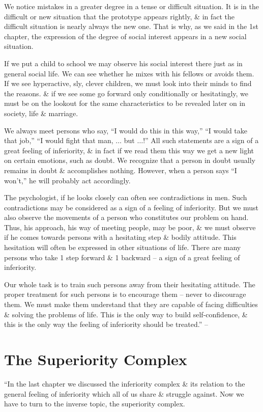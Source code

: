 \documentclass{article}
\numberwithin{equation}{section}
\begin{document}
We notice mistakes in a greater degree in a tense or difficult situation. It is in the difficult or new situation that the prototype appears rightly, \& in fact the difficult situation is nearly always the new one. That is why, as we said in the 1st chapter, the expression of the degree of social interest appears in a new social situation.

If we put a child to school we may observe his social interest there just as in general social life. We can see whether he mixes with his fellows or avoids them. If we see hyperactive, sly, clever children, we must look into their minds to find the reasons. \& if we see some go forward only conditionally or hesitatingly, we must be on the lookout for the same characteristics to be revealed later on in society, life \& marriage.

We always meet persons who say, ``I would do this in this way,'' ``I would take that job,'' ``I would fight that man, $\ldots$ but $\ldots$!'' All such statements are a sign of a great feeling of inferiority, \& in fact if we read them this way we get a new light on certain emotions, such as doubt. We recognize that a person in doubt usually remains in doubt \& accomplishes nothing. However, when a person says ``I won't,'' he will probably act accordingly.

The psychologist, if he looks closely can often see contradictions in men. Such contradictions may be considered as a sign of a feeling of inferiority. But we must also observe the movements of a person who constitutes our problem on hand. Thus, his approach, his way of meeting people, may be poor, \& we must observe if he comes towards persons with a hesitating step \& bodily attitude. This hesitation will often be expressed in other situations of life. There are many persons who take 1 step forward \& 1 backward -- a sign of a great feeling of inferiority.

Our whole task is to train such persons away from their hesitating attitude. The proper treatment for such persons is to encourage them -- never to discourage them. We must make them understand that they are capable of facing difficulties \& solving the problems of life. This is the only way to build self-confidence, \& this is the only way the feeling of inferiority should be treated.'' -- \cite[pp. 56--77]{Adler2013}


\section{The Superiority Complex}
``In the last chapter we discussed the inferiority complex \& its relation to the general feeling of inferiority which all of us share \& struggle against. Now we have to turn to the inverse topic, the superiority complex.
\end{document}
